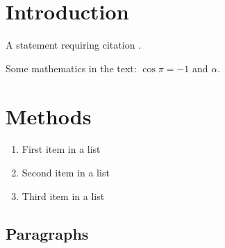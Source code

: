 \documentclass[
10pt, %
a4paper, %
oneside, %
headinclude,footinclude, %
BCOR5mm, %
]{scrartcl}
\begin{document}
\let\thefootnote\relax{}

\let\thefootnote\relax{}


\newpage %


\section{Introduction}

A statement requiring citation \cite{Figueredo:2009dg}.

\lipsum[1-3] %

Some mathematics in the text: $\cos\pi=-1$ and $\alpha$.
 

\section{Methods}

\lipsum[5] %

\begin{enumerate}[noitemsep] %
\item First item in a list
\item Second item in a list
\item Third item in a list
\end{enumerate}


\subsection{Paragraphs}
\end{document}
